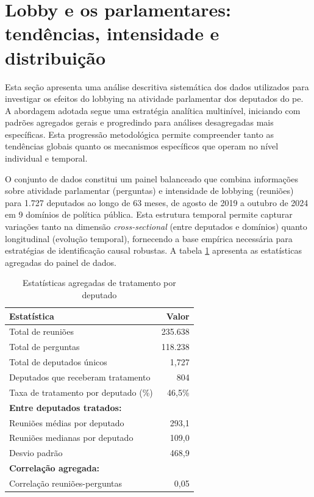 \section{Lobby e os parlamentares: tendências, intensidade e distribuição}
\label{sec:resultados_descritica}

Esta seção apresenta uma análise descritiva sistemática dos dados utilizados para investigar os efeitos do lobbying na atividade parlamentar dos deputados do \acrshort{pe}. A abordagem adotada segue uma estratégia analítica multinível, iniciando com padrões agregados gerais e progredindo para análises desagregadas mais específicas. Esta progressão metodológica permite compreender tanto as tendências globais quanto os mecanismos específicos que operam no nível individual e temporal.

O conjunto de dados constitui um painel balanceado que combina informações sobre atividade parlamentar (perguntas) e intensidade de lobbying (reuniões) para 1.727 deputados ao longo de 63 meses, de agosto de 2019 a outubro de 2024 em 9 domínios de política pública. Esta estrutura temporal permite capturar variações tanto na dimensão \textit{cross-sectional} (entre deputados e domínios) quanto longitudinal (evolução temporal), fornecendo a base empírica necessária para estratégias de identificação causal robustas. A tabela \ref{tab:mep_treatment_stats} apresenta as estatísticas agregadas do painel de dados.

\begin{table}[htbp]
    \centering
    \caption{Estatísticas agregadas de tratamento por deputado}
    \label{tab:mep_treatment_stats}
    \begin{tabular}{lr}
    \toprule
    \textbf{Estatística} & \textbf{Valor} \\
    \midrule
    Total de reuniões & 235.638 \\
    Total de perguntas & 118.238 \\
    Total de deputados únicos & 1{,}727 \\
    Deputados que receberam tratamento & 804 \\
    Taxa de tratamento por deputado (\%) & 46{,}5\% \\
    \midrule
    \textbf{Entre deputados tratados:} & \\
    Reuniões médias por deputado & 293{,}1 \\
    Reuniões medianas por deputado & 109{,}0 \\
    Desvio padrão & 468{,}9 \\
    \midrule
    \textbf{Correlação agregada:} & \\
    Correlação reuniões-perguntas & 0{,}05 \\
    \bottomrule
    \end{tabular}
\end{table}

